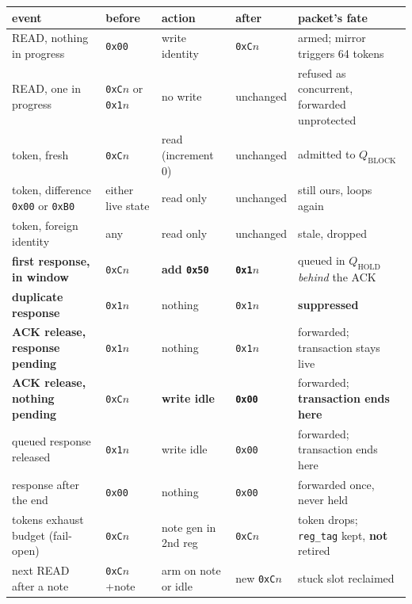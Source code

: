 \documentclass[10pt,a4paper,oneside]{article}
\newcommand{\code}[1]{\texttt{\small #1}}
\begin{document}
\begin{center}\small
\begin{tabular}{@{}>{\raggedright\arraybackslash}p{}>{\raggedright\arraybackslash}p{}>{\raggedright\arraybackslash}p{}>{\raggedright\arraybackslash}p{}>{\raggedright\arraybackslash}p{}@{}}
\toprule
\textbf{event} & \textbf{before} & \textbf{action} & \textbf{after} & \textbf{packet's fate} \\
\midrule
READ, nothing in progress & \code{0x00} & write identity & \code{0xC}$n$ & armed; mirror triggers 64 tokens \\
READ, one in progress & \code{0xC}$n$ or \code{0x1}$n$ & no write & unchanged & refused as concurrent, forwarded unprotected \\
token, fresh & \code{0xC}$n$ & read (increment 0) & unchanged & admitted to $Q_{\mathrm{BLOCK}}$ \\
token, difference \code{0x00} or \code{0xB0} & either live state & read only & unchanged & still ours, loops again \\
token, foreign identity & any & read only & unchanged & stale, dropped \\
\textbf{first response, in window} & \code{0xC}$n$ & \textbf{add \code{0x50}} & \textbf{\code{0x1}$n$} & queued in $Q_{\mathrm{HOLD}}$ \emph{behind} the ACK \\
\textbf{duplicate response} & \code{0x1}$n$ & nothing & \code{0x1}$n$ & \textbf{suppressed} \\
\textbf{ACK release, response pending} & \code{0x1}$n$ & nothing & \code{0x1}$n$ & forwarded; transaction stays live \\
\textbf{ACK release, nothing pending} & \code{0xC}$n$ & \textbf{write idle} & \textbf{\code{0x00}} & forwarded; \textbf{transaction ends here} \\
queued response released & \code{0x1}$n$ & write idle & \code{0x00} & forwarded; transaction ends here \\
response after the end & \code{0x00} & nothing & \code{0x00} & forwarded once, never held \\
tokens exhaust budget (fail-open) & \code{0xC}$n$ & note gen in 2nd reg & \code{0xC}$n$ & token drops; \code{reg\_tag} kept, \textbf{not} retired \\
next READ after a note & \code{0xC}$n$+note & arm on note or idle & new \code{0xC}$n$ & stuck slot reclaimed \\
\bottomrule
\end{tabular}
\end{center}
\end{document}
